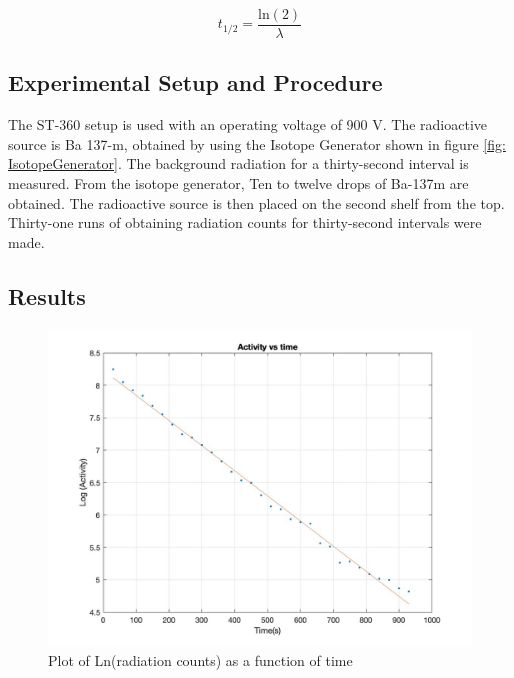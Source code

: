 \documentclass[reprint,amsmath,amssymb,aps,prl]{revtex4-2}
\begin{document}
\begin{equation} \label{eq: lab13 halfTime formula}
    t_{1/2} = \frac{ \text{ln} (2)}{ \lambda }
\end{equation}


\subsection{Experimental Setup and Procedure}
The ST-360 setup is used with an operating voltage of 900 V. The radioactive source is Ba 137-m, obtained by using the Isotope Generator shown in figure \ref{fig: IsotopeGenerator}. The background radiation for a thirty-second interval is measured. From the isotope generator, Ten to twelve drops of Ba-137m are obtained. The radioactive source is then placed on the second shelf from the top. Thirty-one runs of obtaining radiation counts for thirty-second intervals were made.  


\subsection{Results}
\begin{figure}
    \centering
    \includegraphics[width = \columnwidth]{Lab13_ActivityPlot.jpg}
    \caption{Plot of Ln(radiation counts) as a function of time}
    \label{fig: ActivityPlot_Lab13}
\end{figure}
\end{document}

